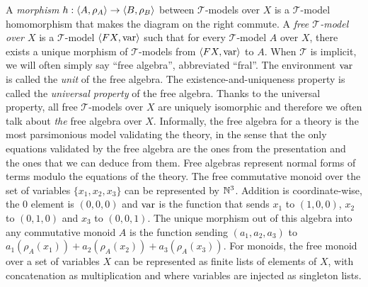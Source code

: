 \begin{figure}
\end{figure}
A \emph{morphism} $h : \left\langle A, \rho_A \right\rangle \to \left\langle B, \rho_B \right\rangle$ between $\mathcal T$-models over $X$ is a $\mathcal T$-model homomorphism that makes the diagram on the right commute. A \emph{free $\mathcal{T}$-model over $X$} is a $\mathcal T$-model $\left\langle FX, \operatorname{var} \right\rangle$ such that for every $\mathcal T$-model $A$ over $X$, there exists a unique morphism of $\mathcal T$-models from $\left\langle FX, \operatorname{var} \right\rangle$ to $A$. When $\mathcal{T}$ is implicit, we will often simply say ``free algebra'', abbreviated ``fral''. The environment $\operatorname{var}$ is called the \emph{unit} of the free algebra. The existence-and-uniqueness property is called the \emph{universal property} of the free algebra. Thanks to the universal property, all free $\mathcal{T}$-models over $X$ are uniquely isomorphic and therefore we often talk about \emph{the} free algebra over $X$. Informally, the free algebra for a theory is the most parsimonious model validating the theory, in the sense that the only equations validated by the free algebra are the ones from the presentation and the ones that we can deduce from them. Free algebras represent normal forms of terms modulo the equations of the theory. The free commutative monoid over the set of variables $\{x_1, x_2, x_3\}$ can be represented by $\mathbb N^3$. Addition is coordinate-wise, the $0$ element is $(0, 0, 0)$ and $\operatorname{var}$ is the function that sends $x_1$ to $(1, 0, 0)$, $x_2$ to $(0, 1, 0)$ and $x_3$ to $(0, 0, 1)$. The unique morphism out of this algebra into any commutative monoid $A$ is the function sending $(a_1, a_2, a_3)$ to $a_1(\rho_A(x_1)) + a_2(\rho_A(x_2)) + a_3(\rho_A(x_3))$. For monoids, the free monoid over a set of variables $X$ can be represented as finite lists of elements of $X$, with concatenation as multiplication and where variables are injected as singleton lists. 

